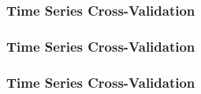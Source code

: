 \documentclass{beamer}
\begin{document}
\begin{frame}
  \frametitle{Time Series Cross-Validation}
  \end{frame}

\begin{frame}
  \frametitle{Time Series Cross-Validation}
  \end{frame}

\begin{frame}
  \frametitle{Time Series Cross-Validation}
  \end{frame}
\end{document}
